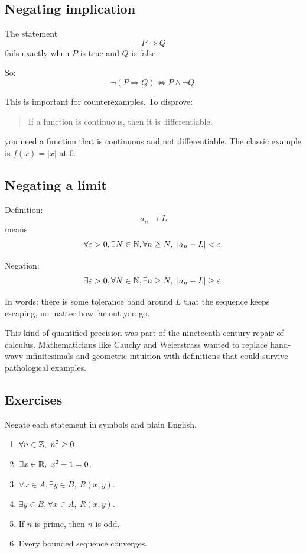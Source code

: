 \documentclass[12pt]{article}
\begin{document}
\subsection{Negating implication}

The statement
\[
P\Rightarrow Q
\]
fails exactly when $P$ is true and $Q$ is false.

So:
\[
\neg(P\Rightarrow Q)\Longleftrightarrow P\land\neg Q.
\]

This is important for counterexamples. To disprove:

\begin{quote}
If a function is continuous, then it is differentiable.
\end{quote}

you need a function that is continuous and not differentiable. The classic example is $f(x)=|x|$ at $0$.

\subsection{Negating a limit}

Definition:
\[
a_n\to L
\]
means
\[
\forall \varepsilon>0,\exists N\in\mathbb{N},\forall n\geq N,\ |a_n-L|<\varepsilon.
\]

Negation:
\[
\exists \varepsilon>0,\forall N\in\mathbb{N},\exists n\geq N,\ |a_n-L|\geq\varepsilon.
\]

In words: there is some tolerance band around $L$ that the sequence keeps escaping, no matter how far out you go.

\begin{historybox}
This kind of quantified precision was part of the nineteenth-century repair of calculus. Mathematicians like Cauchy and Weierstrass wanted to replace hand-wavy infinitesimals and geometric intuition with definitions that could survive pathological examples.
\end{historybox}

\subsection{Exercises}

Negate each statement in symbols and plain English.

\begin{enumerate}
\item $\forall n\in\Z,\ n^2\geq0$.
\item $\exists x\in\R,\ x^2+1=0$.
\item $\forall x\in A,\exists y\in B,\ R(x,y)$.
\item $\exists y\in B,\forall x\in A,\ R(x,y)$.
\item If $n$ is prime, then $n$ is odd.
\item Every bounded sequence converges.
\end{enumerate}
\end{document}
